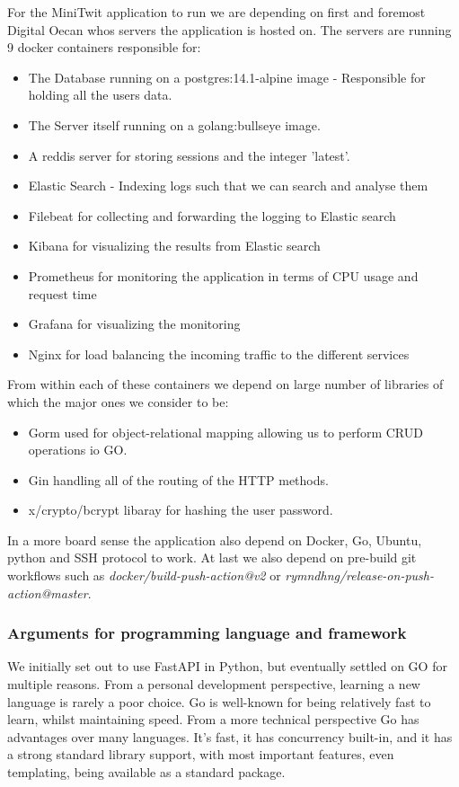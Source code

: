 For the MiniTwit application to run we are depending on first and foremost Digital Oecan whos servers the application is 
hosted on. The servers are running 9 docker containers responsible for: 
\begin{itemize}
    \item The Database running on a postgres:14.1-alpine image - Responsible for holding all the users data.
    \item The Server itself running on a golang:bullseye image.
    \item A reddis server for storing sessions and the integer 'latest'.
    \item Elastic Search - Indexing logs such that we can search and analyse them
    \item Filebeat for collecting and forwarding the logging to Elastic search
    \item Kibana for visualizing the results from Elastic search
    \item Prometheus for monitoring the application in terms of CPU usage and request time
    \item Grafana for visualizing the monitoring
    \item Nginx for load balancing the incoming traffic to the different services
\end{itemize}

From within each of these containers we depend on large number of libraries of which the major ones we consider to be:
\begin{itemize}
    \item Gorm used for object-relational mapping allowing us to perform CRUD operations io GO.
    \item Gin handling all of the routing of the HTTP methods.
    \item x/crypto/bcrypt libaray for hashing the user password.
\end{itemize}

In a more board sense the application also depend on Docker, Go, Ubuntu, python and SSH protocol to work. At last we 
also depend on pre-build git workflows such as \textit{docker/build-push-action@v2} or \textit{rymndhng/release-on-push-action@master}.

\subsubsection{Arguments for programming language and framework}
We initially set out to use FastAPI in Python, but eventually settled on GO for multiple reasons. From a personal 
development perspective, learning a new language is rarely a poor choice. Go is well-known for being relatively 
fast to learn, whilst maintaining speed. From a more technical perspective Go has advantages over many languages. 
It's fast, it has concurrency built-in, and it has a strong standard library support, with most important features, 
even templating, being available as a standard package.\\

